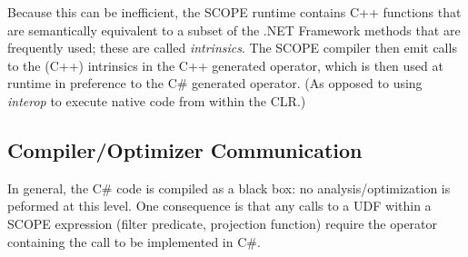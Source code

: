 Because this can be inefficient, the SCOPE runtime contains C++ functions that are semantically equivalent to a subset of the .NET Framework methods that are frequently used; these are called {\it intrinsics}.
The SCOPE compiler then emit calls to the (C++) intrinsics in the C++ generated operator, which is then used at runtime in preference to the C\# generated operator.
(As opposed to using {\it interop} to execute native code from within the CLR.)

\subsection{Compiler/Optimizer Communication}
In general, the C\# code is compiled as a black box: no analysis/optimization is peformed at this level.
One consequence is that any calls to a
UDF within a SCOPE expression (filter predicate, projection function) require the operator containing
the call to be implemented in C\#.

